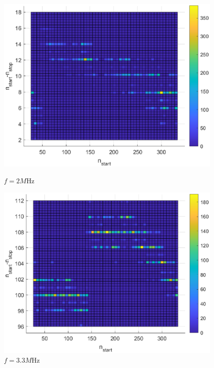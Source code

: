 \begin{figure}[H]
     \centering
     \begin{minipage}{0.45\textwidth}
         \centering
         \includegraphics[width=\textwidth]{imagenes/start-stop_2M.eps} %
         \caption{$f = 2M$Hz}
     \end{minipage}\hfill
     \begin{minipage}{0.45\textwidth}
         \centering
         \includegraphics[width=\textwidth]{imagenes/start-stop_3M3.eps} %
         \caption{$f = 3.3M$Hz}
     \end{minipage}
     

\end{figure}
